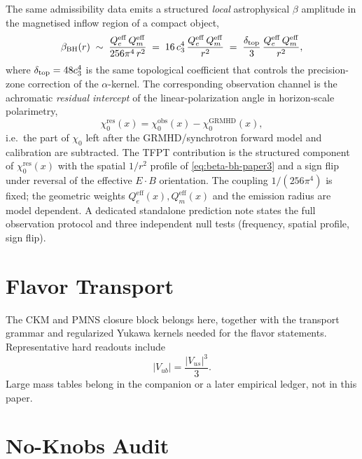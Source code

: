 \documentclass[11pt,a4paper]{article}
\begin{document}
\begin{remark}
\label{rem:dyonic-intercept-alpha-kernel}
The same admissibility data emits a structured \emph{local} astrophysical $\beta$ amplitude in
the magnetised inflow region of a compact object,
\begin{equation}
\label{eq:beta-bh-paper3}
\beta_{\mathrm{BH}}(r)\;\sim\;\frac{Q_e^{\mathrm{eff}}\,Q_m^{\mathrm{eff}}}{256\pi^4\,r^2}
\;=\;16\,c_3^4\,\frac{Q_e^{\mathrm{eff}}\,Q_m^{\mathrm{eff}}}{r^2}
\;=\;\frac{\delta_{\mathrm{top}}}{3}\,\frac{Q_e^{\mathrm{eff}}\,Q_m^{\mathrm{eff}}}{r^2},
\end{equation}
where $\delta_{\mathrm{top}}=48c_3^4$ is the same topological coefficient that controls the precision-zone
correction of the $\alpha$-kernel. The corresponding observation channel is the achromatic
\emph{residual intercept} of the linear-polarization angle in horizon-scale polarimetry,
\[
\chi_0^{\mathrm{res}}(x)
=
\chi_0^{\mathrm{obs}}(x)-\chi_0^{\mathrm{GRMHD}}(x),
\]
i.e.\ the part of $\chi_0$ left after the GRMHD/synchrotron forward model and calibration are
subtracted. The TFPT contribution is the structured component of $\chi_0^{\mathrm{res}}(x)$ with
the spatial $1/r^2$ profile of \eqref{eq:beta-bh-paper3} and a sign flip under reversal of the
effective $E\!\cdot\!B$ orientation. The coupling $1/(256\pi^4)$ is fixed; the geometric weights
$Q_e^{\mathrm{eff}}(x), Q_m^{\mathrm{eff}}(x)$ and the emission radius are model dependent. A
dedicated standalone prediction note states the full observation protocol and three independent
null tests (frequency, spatial profile, sign flip).
\end{remark}

\section{Flavor Transport}

The CKM and PMNS closure block belongs here, together with the transport grammar and regularized
Yukawa kernels needed for the flavor statements. Representative hard readouts include
\[
|V_{ub}|=\frac{|V_{us}|^3}{3}.
\]
Large mass tables belong in the companion or a later empirical ledger, not in this paper.

\section{No-Knobs Audit}
\end{document}
